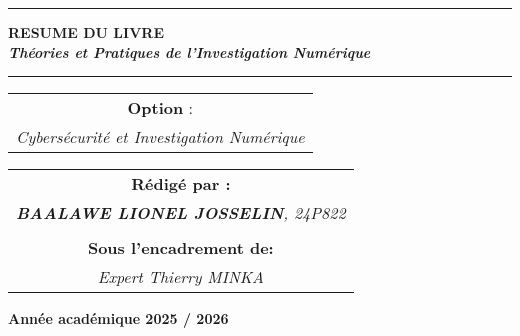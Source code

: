 \documentclass[memoire, 12pt]{report}
\begin{document}
\begin{titlepage}
\begin{center}
		\vspace{0.5cm}
		\begin{tabular}{l*{40}{@{\hskip 3.5cm}c@{\hskip5cm}} p{3.5cm} r}
		\end{tabular}
		
		\noindent\rule{\textwidth}{0.7mm}
		\Large{{\textbf{RESUME DU LIVRE}}}\\
		\Large{{\textbf{\textit{Théories et Pratiques de l’Investigation Numérique}}}}
		\noindent\rule{\textwidth}{0.7mm}
	\end{center}
		
	\begin{center}
	\begin{tabular}{c}
		
		\vspace{0.1cm}
		\normalsize
	
	
		\vspace{1cm}
		\normalsize\textbf{Option }:\\
		\normalsize				
		\textsl{Cybersécurité et Investigation Numérique}
		
	\end{tabular}
	\end{center}
		
	\begin{center}
		\normalsize %
		\begin{tabular}{c}
			\vspace{0.07cm}
			\hspace{0.02cm} \textbf{\textbf{Rédigé par :}}\\
			\hspace{0.02cm} \textsl{\textbf{BAALAWE LIONEL JOSSELIN}, 24P822}\\\\
			\vspace{0.1cm}
			\hspace{0.02cm} \textbf{Sous l'encadrement de:}\\
			\hspace{0.02cm} \textsl{Expert Thierry MINKA}\\
				
               
		\end{tabular}
	\end{center}
    
	\vspace{4cm}
	\begin{center}
		\textbf{Année académique 2025 / 2026}
	\end{center}
		
	\vspace{-1.4cm}
	
		
	\vfill%
	
\end{titlepage}
\end{document}
